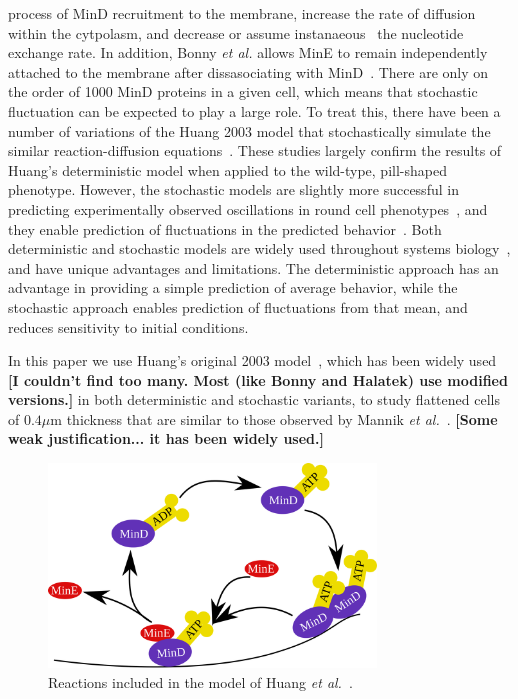 \documentclass[10pt,letterpaper]{article}
\newcommand\micron{\ensuremath{\mu\text{m}}}
\newcommand{\fixme}[1]{\red{[#1]}}
\newcommand{\red}[1]{{\bf \color{red} #1}}
\begin{document}
process of MinD recruitment to the membrane, increase the rate of
diffusion within the cytpolasm, and decrease or assume
instanaeous~\cite{bonny2013membrane} the nucleotide exchange rate.  In
addition, Bonny \emph{et al.} allows MinE to remain independently
attached to the membrane after dissasociating with
MinD~\cite{bonny2013membrane}.
%
There are only on the order of 1000 MinD proteins in a given cell,
which means that stochastic fluctuation can be expected to play a
large role.  To treat this, there have been a number of variations of
the Huang 2003 model that stochastically simulate the similar
reaction-diffusion equations~\cite{fange2006noise, kerr2006division}.
These studies largely confirm the results of Huang's deterministic
model when applied to the wild-type, pill-shaped phenotype.  However,
the stochastic models are slightly more successful in predicting
experimentally observed oscillations in round cell
phenotypes~\cite{fange2006noise, huang2004min}, and they enable
prediction of fluctuations in the predicted
behavior~\cite{kruse2007experimentalist}.  Both deterministic and
stochastic models are widely used throughout systems
biology~\cite{lawson2013spatial, robb2014stochastic,
  oguz2014stochastic, fu2013deterministic, rudiger2014stochastic}, and
have unique advantages and limitations.  The deterministic approach
has an advantage in providing a simple prediction of average behavior,
while the stochastic approach enables prediction of fluctuations from
that mean, and reduces sensitivity to initial conditions.

In this paper we use Huang's original 2003
model~\cite{huang2003dynamic}, which has been widely
used~\cite{hattne2005stochastic,huang2004min,kerr2006division}
\fixme{I couldn't find too many.  Most (like Bonny and Halatek) use
  modified versions.} in both deterministic and stochastic variants,
to study flattened cells of $0.4\micron$ thickness that are similar to
those observed by Mannik \emph{et al.}~\cite{mannik2009bacterial}.
\fixme{Some weak justification... it has been widely used.}

\begin{figure}
  \includegraphics[width=8.7cm]{reactions}
  \caption{Reactions included in the model of Huang \emph{et
      al.}~\cite{huang2003dynamic}.}\label{fig:reactions}
\end{figure}
\end{document}
